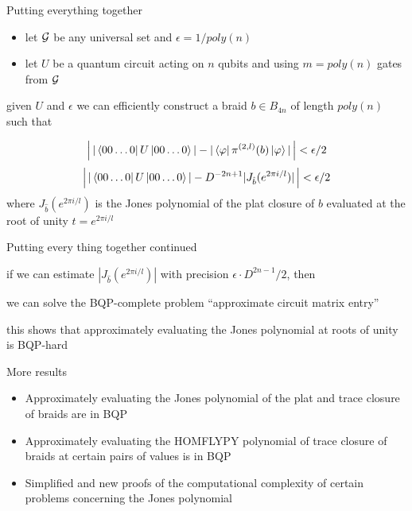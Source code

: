 \documentclass{prosper}
\renewcommand{\>}{\rangle}
\newcommand{\<}{\langle}
\begin{document}
\begin{slide}{Putting everything together}
\begin{itemize}
\item let ${\cal G}$ be any universal set and $\epsilon=1/poly(n)$
\item let $U$ be a quantum circuit acting on $n$ qubits and using $m=poly(n)$ gates from ${\cal G}$ 
\end{itemize}
given $U$ and $\epsilon$ we can efficiently construct a braid $b\in B_{4n}$ of
length $poly(n)$ such that

\[
\left|\, 
|\left\langle{00\ldots 0}\right\vert U \left\vert{00\ldots 0}\right\rangle| - 
|\left\langle{\varphi}\right\vert \pi^{(2,l)}(b) \left\vert{\varphi}\right\rangle| \,
\right| < \epsilon/2
\]
\[
\left|\, 
|\left\langle{00\ldots 0}\right\vert U \left\vert{00\ldots 0}\right\rangle| - 
D^{-2n+1}| J_{\hat{b}}(e^{2\pi i/l})|\, \right| < \epsilon/2
\]
where $J_{\hat{b}}(e^{2\pi i/l})$ is the Jones polynomial of the plat
closure of $b$ evaluated at the root of unity $t=e^{2\pi i/l}$
\end{slide}


\begin{slide}{Putting every thing together continued}

if we can estimate $|J_{\hat{b}}(e^{2\pi i/l})|$ with
precision $\epsilon \cdot D^{2n-1}/2$, then 

we can solve the BQP-complete problem ``approximate circuit
matrix entry''

\bigskip
this shows that approximately evaluating the Jones polynomial at roots of unity is BQP-hard
\end{slide}


\begin{slide}{More results}
\begin{itemize}
\item Approximately evaluating the Jones polynomial of the plat and trace closure of braids are in BQP
\item Approximately evaluating the HOMFLYPY polynomial of trace closure of braids at certain pairs of values is in BQP
\item Simplified and new proofs of the computational complexity of certain problems concerning the Jones polynomial 
\end{itemize}
\end{slide}
\end{document}
